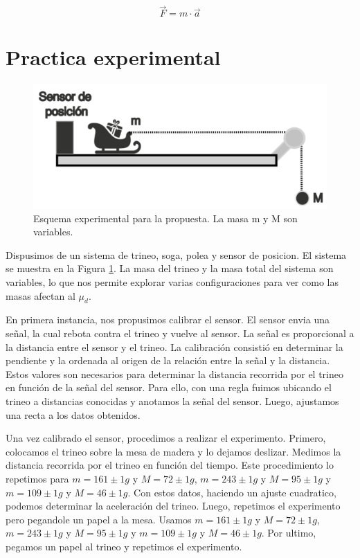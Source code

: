 \documentclass[12pt,a4]{article}
\begin{document}
\[
\vec{F} = m \cdot \vec{a}
\]

\section{Practica experimental}

\begin{figure}[H]
    \centering
    \includegraphics[width=0.9\linewidth]{esquema.png}
    \caption{Esquema experimental para la propuesta. La masa m y M son variables.}
    \label{fig:system}
\end{figure}

Dispusimos de un sistema de trineo, soga, polea y sensor de posicion. El sistema se muestra en la Figura \ref{fig:system}. La masa del trineo y la masa total del sistema son variables, lo que nos permite explorar varias configuraciones para ver como las masas afectan al $\mu_d$.

En primera instancia, nos propusimos calibrar el sensor. El sensor envia una señal, la cual rebota contra el trineo y vuelve al sensor. La señal es proporcional a la distancia entre el sensor y el trineo. La calibración consistió en determinar la pendiente y la ordenada al origen de la relación entre la señal y la distancia. Estos valores son necesarios para determinar la distancia recorrida por el trineo en función de la señal del sensor. Para ello, con una regla fuimos ubicando el trineo a distancias conocidas y anotamos la señal del sensor. Luego, ajustamos una recta a los datos obtenidos.

Una vez calibrado el sensor, procedimos a realizar el experimento. Primero, colocamos el trineo sobre la mesa de madera y lo dejamos deslizar. Medimos la distancia recorrida por el trineo en función del tiempo. Este procedimiento lo repetimos para $m = 161 \pm 1 g$ y $M = 72 \pm 1 g$, $m = 243 \pm 1 g$ y $M = 95 \pm 1 g$ y $m = 109 \pm 1 g$ y $M = 46 \pm 1 g$. Con estos datos, haciendo un ajuste cuadratico, podemos determinar la aceleración del trineo. 
Luego, repetimos el experimento pero pegandole un papel a la mesa. Usamos $m = 161 \pm 1 g$ y $M = 72 \pm 1 g$, $m = 243 \pm 1 g$ y $M = 95 \pm 1 g$ y $m = 109 \pm 1 g$ y $M = 46 \pm 1 g$. 
Por ultimo, pegamos un papel al trineo y repetimos el experimento.
\end{document}
